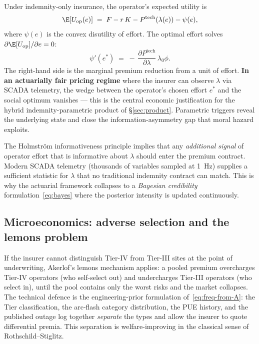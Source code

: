 Under indemnity-only insurance, the operator's expected utility is
\begin{equation}\label{eq:agent}
   \E[U_{\mathrm{op}}(e)] \;=\; F - r\,K - P^{\mathrm{tech}}(\lambda(e))
   - \psi(e),
\end{equation}
where $\psi(e)$ is the convex disutility of effort. The optimal effort
solves $\partial\E[U_{\mathrm{op}}]/\partial e=0$:
\begin{equation}\label{eq:efforth}
   \psi'(e^*) \;=\; -\,\frac{\partial P^{\mathrm{tech}}}{\partial\lambda}\,
                     \lambda_0 \phi.
\end{equation}
The right-hand side is the marginal premium reduction from a unit of
effort. \textbf{In an actuarially fair pricing regime} where the
insurer can observe $\lambda$ via SCADA telemetry, the wedge between
the operator's chosen effort $e^*$ and the social optimum vanishes ---
this is the central economic justification for the hybrid
indemnity-parametric product of \S\ref{sec:product}. Parametric
triggers reveal the underlying state and close the
information-asymmetry gap that moral hazard exploits.

\clearpage
\begin{rbox}
The Holmstr\"om informativeness principle implies that any
\emph{additional signal} of operator effort that is informative about
$\lambda$ should enter the premium contract. Modern SCADA telemetry
(thousands of variables sampled at \SI{1}{Hz}) supplies a sufficient
statistic for $\lambda$ that no traditional indemnity contract can
match. This is why the actuarial framework collapses to a
\emph{Bayesian credibility} formulation~\eqref{eq:bayes} where the
posterior intensity is updated continuously.
\end{rbox}

\subsection{Microeconomics: adverse selection and the lemons problem}\label{ss:lemons}

If the insurer cannot distinguish Tier-IV from Tier-III sites at the
point of underwriting, Akerlof's lemons mechanism applies: a pooled
premium overcharges Tier-IV operators (who self-select out) and
undercharges Tier-III operators (who select in), until the pool
contains only the worst risks and the market collapses. The technical
defence is the engineering-prior formulation
of~\eqref{eq:freq-from-A}: the Tier classification, the arc-flash
category distribution, the PUE history, and the published outage log
together \emph{separate} the types and allow the insurer to quote
differential premia. This separation is welfare-improving in the
classical sense of Rothschild--Stiglitz.

